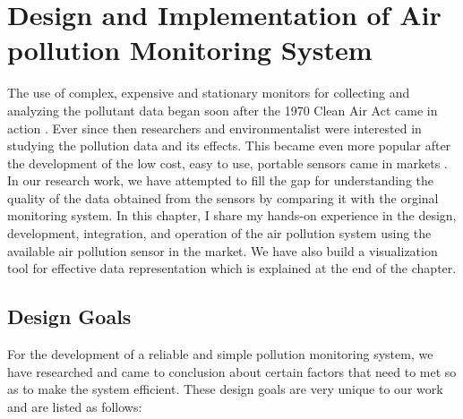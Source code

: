
\chapter{Design and Implementation of Air pollution Monitoring System}

  
The use of complex, expensive and stationary monitors for collecting and analyzing the pollutant data began soon after the 1970 Clean Air Act came in action \cite{Daly2007}. Ever since then researchers and environmentalist were interested in studying the pollution data and its effects. This became even more popular after the development of the low cost, easy to use, portable sensors came in markets \cite{Snyder2013}. In our research work, we have attempted to fill the gap for understanding the quality of the data obtained from the sensors by comparing it with the orginal monitoring system. In this chapter, I share my hands-on experience in the design, development, integration, and operation of the air pollution system using the available air pollution sensor in the market. We have also build a visualization tool for effective data representation which is explained at the end of the chapter.
 
\section{Design Goals}

For the development of a reliable and simple pollution monitoring system, we have researched and came to conclusion about certain factors that need to met so as to make the system efficient. These design goals are very unique to our work and are listed as follows: 


